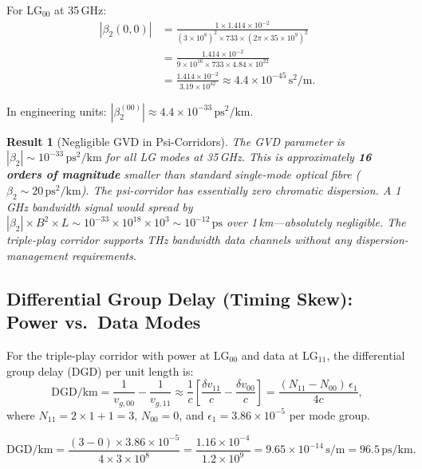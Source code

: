 \documentclass[aps,prd,twocolumn,superscriptaddress]{revtex4-2}
\newcommand{\LG}{\mathrm{LG}}
\newtheorem{result}{Result}
\begin{document}
For LG$_{00}$ at 35\,GHz:
\begin{align}
|\beta_2(0,0)| &= \frac{1\times1.414\times10^{-2}}
{(3\times10^8)^2\times733\times(2\pi\times35\times10^9)^2}
\nonumber\\
&= \frac{1.414\times10^{-2}}
{9\times10^{16}\times733\times4.84\times10^{22}}
\nonumber\\
&= \frac{1.414\times10^{-2}}{3.19\times10^{42}}
\approx 4.4\times10^{-45}\,\mathrm{s}^2/\mathrm{m}.
\end{align}

In engineering units: $|\beta_2^{(00)}| \approx 4.4\times10^{-33}\,\mathrm{ps}^2/\mathrm{km}$.

\begin{result}[Negligible GVD in Psi-Corridors]
The GVD parameter is $|\beta_2|\sim10^{-33}\,\mathrm{ps}^2/\mathrm{km}$
for all LG modes at 35\,GHz.  This is approximately \textbf{16 orders
of magnitude} smaller than standard single-mode optical fibre
($\beta_2 \sim 20\,\mathrm{ps}^2/\mathrm{km}$).  The psi-corridor
has essentially zero chromatic dispersion.  A 1\,GHz bandwidth signal
would spread by $|\beta_2|\times B^2\times L \sim 10^{-33}\times
10^{18}\times10^3 \sim 10^{-12}\,\mathrm{ps}$ over 1\,km---absolutely
negligible.  The triple-play corridor supports THz bandwidth data
channels without any dispersion-management requirements.
\end{result}

\subsection{Differential Group Delay (Timing Skew): Power vs.\ Data Modes}
\label{sec:skew}

For the triple-play corridor with power at $\LG_{00}$ and data at
$\LG_{11}$, the differential group delay (DGD) per unit length is:
\begin{equation}
\mathrm{DGD/km} = \frac{1}{v_{g,00}} - \frac{1}{v_{g,11}}
\approx \frac{1}{c}\left[\frac{\delta v_{11}}{c} - \frac{\delta v_{00}}{c}\right]
= \frac{(N_{11} - N_{00})\,\epsilon_1}{4c},
\label{eq:DGD}
\end{equation}
where $N_{11} = 2\times1 + 1 = 3$, $N_{00} = 0$, and $\epsilon_1
= 3.86\times10^{-5}$ per mode group.

\begin{equation}
\mathrm{DGD/km} = \frac{(3-0)\times3.86\times10^{-5}}{4\times3\times10^8}
= \frac{1.16\times10^{-4}}{1.2\times10^9}
= 9.65\times10^{-14}\,\mathrm{s/m} = 96.5\,\mathrm{ps/km}.
\label{eq:DGD_num}
\end{equation}
\end{document}
